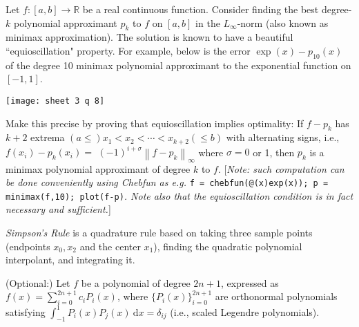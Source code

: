 \documentclass[answers]{exam}
\begin{document}
\begin{questions}
\question%
Let $f:[a, b] \to \mathbb{R}$ be a real continuous function. Consider finding the best degree-$k$ polynomial approximant $p_{k}$ to $f$ on $[a, b]$ in the $L_{\infty}$-norm (also known as minimax approximation). The solution is known to have a beautiful ``equioscillation" property. For example, below is the error $\exp (x)-p_{10}(x)$ of the degree 10 minimax polynomial approximant to the exponential function on $[-1,1]$.
\begin{center}\texttt{[image: sheet 3 q 8]}\end{center}
Make this precise by proving that equioscillation implies optimality: If $f-p_{k}$ has $k+2$ extrema $(a \leq)x_{1}<x_{2}<\cdots<x_{k+2}(\leq b)$ with alternating signs, i.e., $f\left(x_{i}\right)-p_{k}\left(x_{i}\right)=$ $(-1)^{i+\sigma}\left\|f-p_{k}\right\|_{\infty}$ where $\sigma=0$ or 1, then $p_{k}$ is a minimax polynomial approximant of degree $k$ to $f$. [\emph{Note: such computation can be done conveniently using Chebfun as e.g.} \verb|f = chebfun(@(x)exp(x)); p = minimax(f,10); plot(f-p)|\emph{. Note also that the equioscillation condition is in fact necessary and sufficient.}]



\question%
\emph{Simpson's Rule} is a quadrature rule based on taking three sample points (endpoints $x_{0}, x_{2}$ and the center $x_{1}$), finding the quadratic polynomial interpolant, and integrating it.



\question%
(Optional:) Let $f$ be a polynomial of degree $2 n+1$, expressed as $f(x)=\sum_{i=0}^{2 n+1} c_{i} P_{i}(x)$, where $\{P_{i}(x)\}_{i=0}^{2 n+1}$ are orthonormal polynomials satisfying $\int_{-1}^{1} P_{i}(x) P_{j}(x)~\mathrm d x=\delta_{i j}$ (i.e., scaled Legendre polynomials).

\end{questions}
\end{document}
